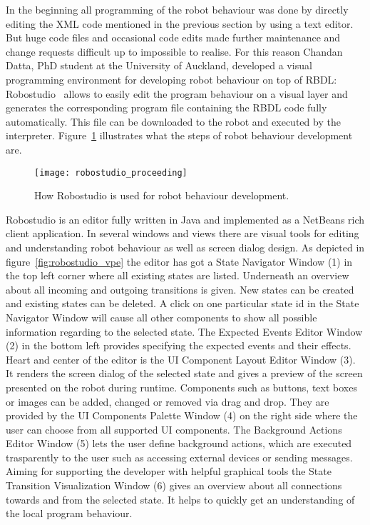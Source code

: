 In the beginning all programming of the robot behaviour was done by directly editing the XML code mentioned in the previous section by using a text editor. But huge code files and occasional code edits made further maintenance and change requests difficult up to impossible to realise. For this reason Chandan Datta, PhD student at the University of Auckland, developed a visual programming environment for developing robot behaviour on top of RBDL: Robostudio~\cite{robostudio} allows to easily edit the program behaviour on a visual layer and generates the corresponding program file containing the RBDL code fully automatically. This file can be downloaded to the robot and executed by the interpreter. Figure~\ref{fig:robostudio_proceeding} illustrates what the steps of robot behaviour development are.

\begin{figure}[htbp]
  \centering
  \texttt{[image: robostudio\_proceeding]} 
  \caption{How Robostudio is used for robot behaviour development.}
  \label{fig:robostudio_proceeding}
\end{figure}

Robostudio is an editor fully written in Java and implemented as a NetBeans rich client application.
In several windows and views there are visual tools for editing and understanding robot behaviour as well as screen dialog design. As depicted in figure~\ref{fig:robostudio_vpe} the editor has got a State Navigator Window (1) in the top left corner where all existing states are listed. Underneath an overview about all incoming and outgoing transitions is given. New states can be created and existing states can be deleted. A click on one particular state id in the State Navigator Window will cause all other components to show all possible information regarding to the selected state.
The Expected Events Editor Window (2) in the bottom left provides specifying the expected events and their effects.
Heart and center of the editor is the UI Component Layout Editor Window (3). It renders the screen dialog of the selected state and gives a preview of the screen presented on the robot during runtime. Components such as buttons, text boxes or images can be added, changed or removed via drag and drop.
They are provided by the UI Components Palette Window (4) on the right side where the user can choose from all supported UI components.
The Background Actions Editor Window (5) lets the user define background actions, which are executed trasparently to the user such as accessing external devices or sending messages.
Aiming for supporting the developer with helpful graphical tools the State Transition Visualization Window (6) gives an overview about all connections towards and from the selected state. It helps to quickly get an understanding of the local program behaviour.


